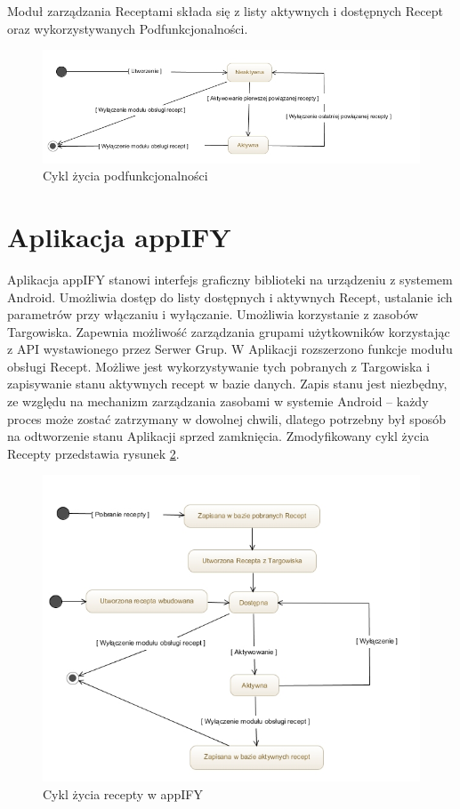 \documentclass[11pt,a4paper,polish,thesis]{dcsbook}
\begin{document}
Moduł zarządzania Receptami składa się z listy aktywnych i dostępnych Recept oraz wykorzystywanych Podfunkcjonalności.
\begin{figure}[H]
  \centering
  \includegraphics[scale=0.6]{./resources/cykl-zycia-featurea.jpg}
  \caption{Cykl życia podfunkcjonalności}
  \label{fig:cykl-zycia-featurea}
\end{figure}

\section{Aplikacja appIFY}
Aplikacja appIFY stanowi interfejs graficzny biblioteki na urządzeniu z systemem Android. Umożliwia dostęp do listy dostępnych i aktywnych Recept, ustalanie ich parametrów przy włączaniu i wyłączanie. Umożliwia korzystanie z zasobów Targowiska. Zapewnia możliwość zarządzania grupami użytkowników korzystając z API wystawionego przez Serwer Grup.
W Aplikacji rozszerzono funkcje modułu obsługi Recept. Możliwe jest wykorzystywanie tych pobranych z Targowiska i zapisywanie stanu aktywnych recept w bazie danych. Zapis stanu jest niezbędny, ze względu na mechanizm zarządzania zasobami w systemie Android -- każdy proces może zostać zatrzymany w dowolnej chwili, dlatego potrzebny był sposób na odtworzenie stanu Aplikacji sprzed zamknięcia. Zmodyfikowany cykl życia Recepty przedstawia rysunek \ref{fig:cykl-zycia-recepty-appify}.
\begin{figure}[H]
  \centering
  \includegraphics[scale=0.7]{./resources/cykl-zycia-recepty-appify.jpg}
  \caption{Cykl życia recepty w appIFY}
  \label{fig:cykl-zycia-recepty-appify}
\end{figure}
\end{document}
